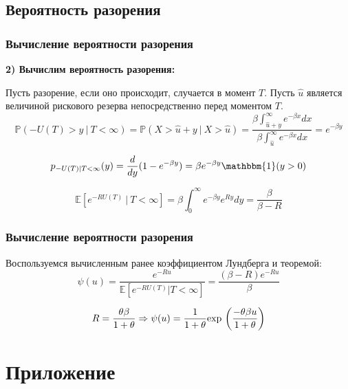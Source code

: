 \documentclass[10pt]{beamer}
\newcommand\Exp{{\rm exp \,}}
\numberwithin{equation}{section}
\begin{document}
\subsection{Вероятность разорения}
\begin{frame}
\frametitle{Вычисление вероятности разорения}
\noindent
\textbf{2) Вычислим вероятность разорения:}

\noindent
Пусть разорение, если оно происходит, случается в момент $T$.
Пусть $\hat{u}$ является величиной рискового резерва непосредственно перед моментом $T$.
\begin{equation}
\mathbb{P}(-U(T)>y\ |\ T < \infty) = \mathbb{P}(X > \hat{u} + y \ | \ X > \hat{u}) =
\frac   {\beta\int_{\hat{u}+y}^{\infty} e^{-\beta x}dx}
        {\beta\int_{\hat{u}}^{\infty}   e^{-\beta x}dx}
                                                        = e^{-\beta y}
\end{equation}

\begin{equation}
p_{-U(T)|T < \infty}(y) = \frac{d}{dy}(1-e^{-\beta y}) = \beta e^{-\beta y} \mathbbm{1}(y > 0)
\end{equation}

\begin{equation}
\mathbb{E}[e^{-RU(T)} \ | \ T<\infty] = \beta\int_{0}^{\infty} e^{-\beta y} e^{Ry}dy =
\frac{\beta}{\beta - R}
\end{equation}
\end{frame}


\begin{frame}
\frametitle{Вычисление вероятности разорения}

\noindent
Воспользуемся вычисленным ранее коэффициентом Лундберга и теоремой:
\begin{equation}
\psi(u) = \frac{e^{-Ru}}{\mathbb{E}[e^{-RU(T)}|T < \infty]} = \frac{(\beta-R)e^{-Ru}}{\beta}
\end{equation}

\begin{equation}
R = \frac{\theta\beta}{1 + \theta} \Rightarrow
\psi(u) = \frac{1}{1+\theta} \Exp\left(\frac{-\theta\beta u}{1+\theta}\right)
\end{equation}
\end{frame}


\section{Приложение}
\end{document}
